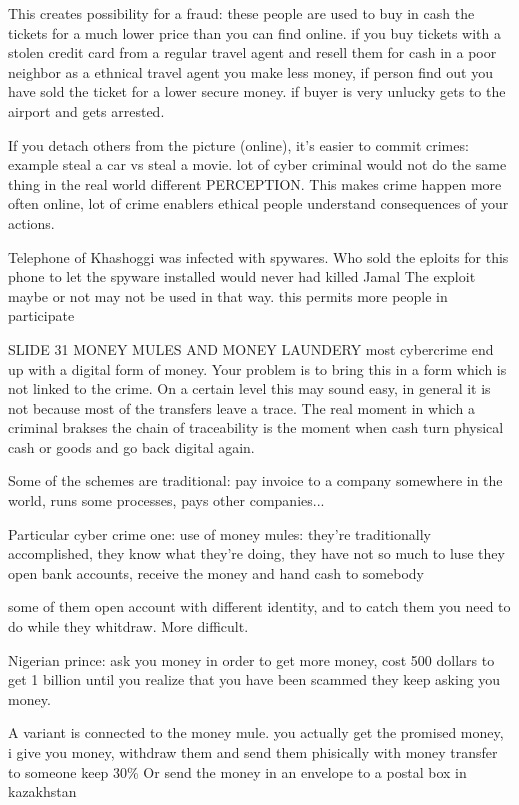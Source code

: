             This creates possibility for a fraud:
                these people are used to buy in cash the tickets for a much lower price than you can find online.
                if you buy tickets with a stolen credit card from a regular travel agent and resell them for cash in a poor neighbor as a ethnical travel agent
                you make less money, if person find out 
                you have sold the ticket for a lower secure money.
                if buyer is very unlucky gets to the airport and gets arrested.

    If you detach others from the picture (online), it's easier to commit crimes: example steal a car vs steal a movie.
    lot of cyber criminal would not do the same thing in the real world
    different PERCEPTION.
    This makes crime happen more often online,
    lot of crime enablers
    ethical people understand consequences of your actions.

Telephone of Khashoggi was infected with spywares.
Who sold the eploits for this phone to let the spyware installed would never had killed Jamal
The exploit maybe or not may not be used in that way.
this permits more people in participate

SLIDE 31 MONEY MULES AND MONEY LAUNDERY
    most cybercrime end up with a digital form of money.
    Your problem is to bring this in a form which is not linked to the crime.
    On a certain level this may sound easy, in general it is not because most of the transfers leave a trace.
    The real moment in which a criminal brakses the chain of traceability is the moment when cash turn physical cash or goods and go back digital again.

    Some of the schemes are traditional:
        pay invoice to a company somewhere in the world, runs some processes, pays other companies... 

    Particular cyber crime one:
        use of money mules: they're traditionally accomplished, they know what they're doing, they have not so much to luse
        they open bank accounts, receive the money and hand cash to somebody
        
        some of them open account with different identity, and to catch them you need to do while they whitdraw. More difficult.

        Nigerian prince:
            ask you money in order to get more money, cost 500 dollars to get 1 billion
            until you realize that you have been scammed they keep asking you money.

            A variant is connected to the money mule.
                you actually get the promised money, i give you money, withdraw them and send them phisically with money transfer to someone
                keep 30\%
                Or send the money in an envelope to a postal box in kazakhstan

